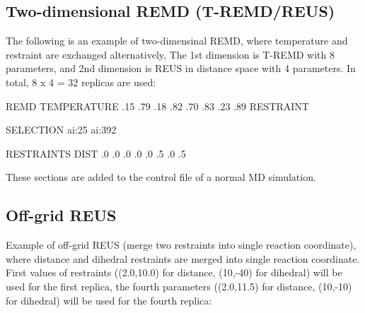 \documentclass[a4paper,11pt,oneside,english]{sphinxmanual}
\begin{document}
\subsection{Two-dimensional REMD (T-REMD/REUS)}
\label{\detokenize{14_REMD:two-dimensional-remd-t-remd-reus}}
The following is an example of two-dimensinal REMD, where
temperature and restraint are exchanged alternatively,
The 1st dimension is T-REMD with 8 parameters,
and 2nd dimension is REUS in distance space with 4 parameters.
In total, 8 x 4 = 32 replicas are used:

\begin{sphinxVerbatim}[commandchars=\\\{\}]
\PYG{o}{[}REMD\PYG{o}{]}
        
  
            TEMPERATURE
        
      .15 .79 .18 .82 .70 .83 .23 .89
            RESTRAINT
        
   

\PYG{o}{[}SELECTION\PYG{o}{]}
           ai:25
           ai:392

\PYG{o}{[}RESTRAINTS\PYG{o}{]}
       
        DIST
         .0   .0   .0   .0
       .0  .5  .0  .5
     
\end{sphinxVerbatim}

These sections are added to the control file of a normal MD simulation.


\subsection{Off-grid REUS}
\label{\detokenize{14_REMD:off-grid-reus}}
Example of off-grid REUS (merge two restraints into single reaction
coordinate), where distance and dihedral restraints are merged into
single reaction coordinate. First values of restraints ((2.0,10.0) for
distance, (10,-40) for dihedral) will be used for the first replica,
the fourth parameters ((2.0,11.5) for distance, (10,-10) for dihedral)
will be used for the fourth replica:
\end{document}
